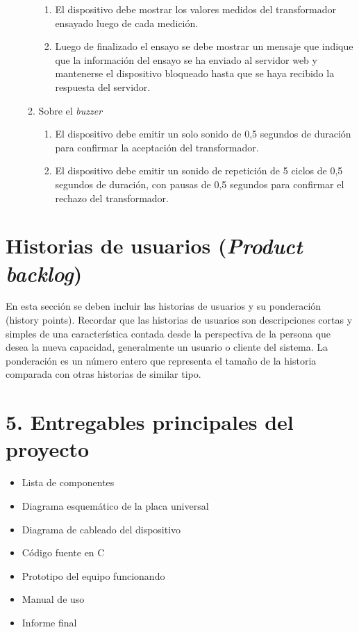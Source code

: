 \documentclass[11pt]{charter}
\begin{document}
\begin{enumerate}
\begin{enumerate}
\begin{enumerate}
		\item El dispositivo debe mostrar los valores medidos del transformador ensayado luego de cada medición.
		\item Luego de finalizado el ensayo se debe mostrar un mensaje que indique que la información del ensayo se ha enviado al servidor web y mantenerse el dispositivo bloqueado hasta que se haya recibido la respuesta del servidor.
		\end{enumerate}
	\item Sobre el \textit{buzzer}
		\begin{enumerate}
		\item El dispositivo debe emitir un solo sonido de 0,5 segundos de duración para confirmar la aceptación del transformador.
		\item El dispositivo debe emitir un sonido de repetición de 5 ciclos de 0,5 segundos de duración, con pausas de 0,5 segundos para confirmar el rechazo del transformador.
		\end{enumerate}		
	\end{enumerate}
\end{enumerate}



\section{Historias de usuarios (\textit{Product backlog})}

En esta sección se deben incluir las historias de usuarios y su ponderación (history points). Recordar que las historias de usuarios son descripciones cortas y simples de una característica contada desde la perspectiva de la persona que desea la nueva capacidad, generalmente un usuario o cliente del sistema. La ponderación es un número entero que representa el tamaño de la historia comparada con otras historias de similar tipo.

\label{sec:backlog}

\section{5. Entregables principales del proyecto}
\label{sec:entregables}


\begin{itemize}
\item Lista de componentes
\item Diagrama esquemático de la placa universal
\item Diagrama de cableado del dispositivo
\item Código fuente en C
\item Prototipo del equipo funcionando
\item Manual de uso
\item Informe final
\end{itemize}
\end{document}
